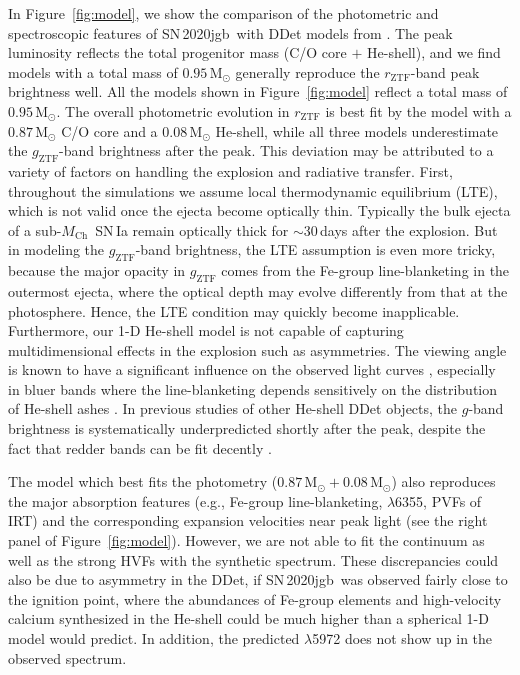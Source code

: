 \documentclass[twocolumn]{aastex631}
\newcommand{\sn}{SN\,2020jgb}
\newcommand{\Mch}{$M_\mathrm{Ch}$}
\begin{document}
\begin{CJK*}{UTF8}{gbsn}
In Figure~\ref{fig:model}, we show the comparison of the photometric and spectroscopic features of \sn\ with DDet models from \citet{polin_observational_2019}. The peak luminosity reflects the total progenitor mass (C/O core $+$ He-shell), and we find models with a total mass of $0.95\,\mathrm{M_\odot}$ generally reproduce the $r_\mathrm{ZTF}$-band peak brightness well. All the models shown in Figure~\ref{fig:model} reflect a total mass of $0.95\,\mathrm{M_\odot}$. The overall photometric evolution in $r_\mathrm{ZTF}$ is best fit by the model with a $0.87\,\mathrm{M_\odot}$ C/O core and a $0.08\,\mathrm{M_\odot}$ He-shell, while all three models underestimate the $g_\mathrm{ZTF}$-band brightness after the peak. This deviation may be attributed to a variety of factors on handling the explosion and radiative transfer. First, throughout the simulations we assume local thermodynamic equilibrium (LTE), which is not valid once the ejecta become optically thin. Typically the bulk ejecta of a sub-\Mch\ SN\,Ia remain optically thick for $\sim$30\,days after the explosion. But in modeling the $g_\mathrm{ZTF}$-band brightness, the LTE assumption is even more tricky, because the major opacity in $g_\mathrm{ZTF}$ comes from the Fe-group line-blanketing in the outermost ejecta, where the optical depth may evolve differently from that at the photosphere. Hence, the LTE condition may quickly become inapplicable. Furthermore, our 1-D He-shell model is not capable of capturing multidimensional effects in the explosion such as asymmetries. The viewing angle is known to have a significant influence on the observed light curves \citep{Kromer_DD_2010, Sim_2012, Gronow_2020, Shen_2D_2021}, especially in bluer bands where the line-blanketing depends sensitively on the distribution of He-shell ashes \citep{Shen_2D_2021}. In previous studies of other He-shell DDet objects, the $g$-band brightness is systematically underpredicted shortly after the peak, despite the fact that redder bands can be fit decently \citep[e.g.,][]{jiang_16jhr_2017,jacobson-galan_16hnk_2020}.

The model which best fits the photometry ($0.87\,\mathrm{M_\odot}+0.08\,\mathrm{M_\odot}$) also reproduces the major absorption features (e.g., Fe-group line-blanketing,  $\lambda$6355, PVFs of  IRT) and the corresponding expansion velocities near peak light (see the right panel of Figure~\ref{fig:model}). However, we are not able to fit the continuum as well as the strong  HVFs with the synthetic spectrum. These discrepancies could also be due to asymmetry in the DDet, if \sn\ was observed fairly close to the ignition point, where the abundances of Fe-group elements and high-velocity calcium synthesized in the He-shell could be much higher than a spherical 1-D model would predict.
In addition, the predicted  $\lambda$5972 does not show up in the observed spectrum.


\end{CJK*}
\end{document}
